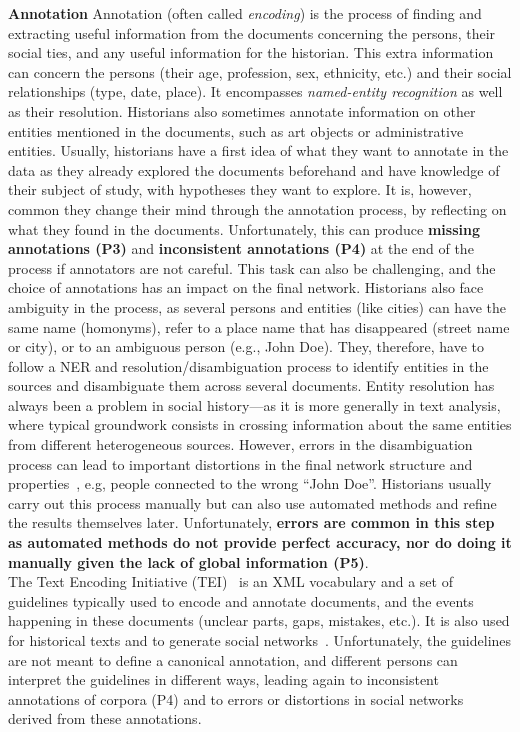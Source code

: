 \noindent\textbf{Annotation}
Annotation (often called \emph{encoding}) is the process of finding and extracting useful information from the documents concerning the persons, their social ties, and any useful information for the historian.
This extra information can concern the persons (their age, profession, sex, ethnicity, etc.) and their social relationships (type, date, place).
It encompasses \emph{named-entity recognition} as well as their resolution.
Historians also sometimes annotate information on other entities mentioned in the documents, such as art objects or administrative entities.
Usually, historians have a first idea of what they want to annotate in the data as they already explored the documents beforehand and have knowledge of their subject of study, with hypotheses they want to explore.
It is, however, common they change their mind through the annotation process, by reflecting on what they found in the documents.
Unfortunately, this can produce \textbf{missing annotations (P3)} and \textbf{inconsistent annotations (P4)} at the end of the process if annotators are not careful.
This task can also be challenging, and the choice of annotations has an impact on the final network.
Historians also face ambiguity in the process, as several persons and entities (like cities) can have the same name (homonyms), refer to a place name that has disappeared (street name or city), or to an ambiguous person (e.g., John Doe).
They, therefore, have to follow a NER and resolution/disambiguation process to identify entities in the sources and disambiguate them across several documents.
Entity resolution has always been a problem in social history---as it is more generally in text analysis, where typical groundwork consists in crossing information about the same entities from different heterogeneous sources.
However, errors in the disambiguation process can lead to important distortions in the final network structure and properties~\cite{diesnerImpactEntityDisambiguation2015}, e.g, people connected to the wrong ``John Doe''.
Historians usually carry out this process manually but can also use automated methods and refine the results themselves later.
Unfortunately, \textbf{errors are common in this step as automated methods do not provide perfect accuracy, nor do doing it manually given the lack of global information (P5)}.\\
The Text Encoding Initiative (TEI)~\cite{TEI} is an XML vocabulary and a set of guidelines typically used to encode and annotate documents, and the events happening in these documents (unclear parts, gaps, mistakes, etc.).
It is also used for historical texts and to generate social networks~\cite{dufournaudComparaisonOutilsPour2006, serranomolineroUnderstandingUseVistorian2017}.
Unfortunately, the guidelines are not meant to define a canonical annotation, and different persons can interpret the guidelines in different ways, leading again to inconsistent annotations of corpora (P4) and to errors or distortions in social networks derived from these annotations.

